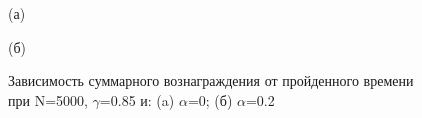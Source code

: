 \documentclass[a4paper]{report}
\theoremstyle{definition}
\theoremstyle{plain}
\theoremstyle{remark}
\theoremstyle{remark}
\theoremstyle{definition}
\begin{document}
\begin{figure}[H]
    \begin{minipage}[H]{0.49\linewidth}
        (а)\\
    \end{minipage}
    \hfill
    \begin{minipage}[H]{0.49\linewidth}
        (б)\\
    \end{minipage}
      \caption{Зависимость суммарного вознаграждения от пройденного времени при N=5000, $\gamma$=0.85 и: (a) $\alpha$=0; (б) $\alpha$=0.2}
\end{figure}
\end{document}
